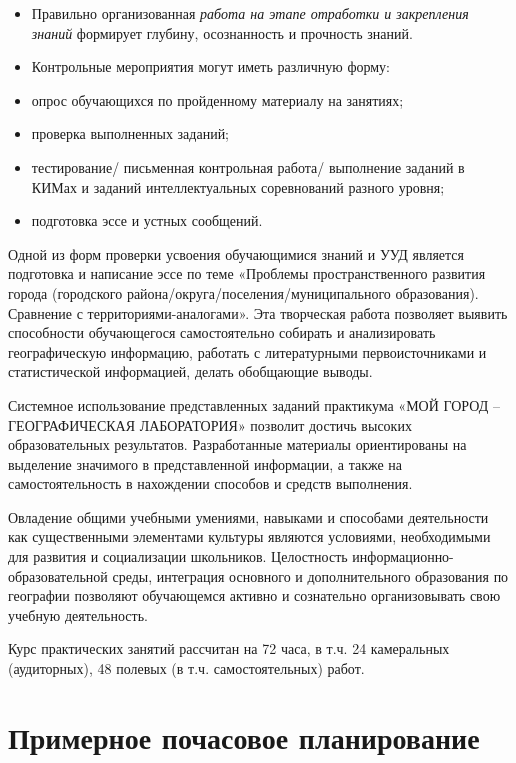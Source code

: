 \documentclass[
  11pt,
  russian,
]{book}
\begin{document}
\begin{itemize}
\item
  Правильно организованная \emph{работа на этапе отработки и закрепления
  знаний} формирует глубину, осознанность и прочность знаний.
\item
  Контрольные мероприятия могут иметь различную форму:
\item
  опрос обучающихся по пройденному материалу на занятиях;
\item
  проверка выполненных заданий;
\item
  тестирование/ письменная контрольная работа/ выполнение заданий в
  КИМах и заданий интеллектуальных соревнований разного уровня;
\item
  подготовка эссе и устных сообщений.
\end{itemize}

Одной из форм проверки усвоения обучающимися знаний и УУД является
подготовка и написание эссе по теме «Проблемы пространственного развития
города (городского района/округа/поселения/муниципального образования).
Сравнение с территориями-аналогами». Эта творческая работа позволяет
выявить способности обучающегося самостоятельно собирать и анализировать
географическую информацию, работать с литературными первоисточниками и
статистической информацией, делать обобщающие выводы.

Системное использование представленных заданий практикума «МОЙ ГОРОД --
ГЕОГРАФИЧЕСКАЯ ЛАБОРАТОРИЯ» позволит достичь высоких образовательных
результатов. Разработанные материалы ориентированы на выделение
значимого в представленной информации, а также на самостоятельность в
нахождении способов и средств выполнения.

Овладение общими учебными умениями, навыками и способами деятельности
как существенными элементами культуры являются условиями, необходимыми
для развития и социализации школьников. Целостность
информационно-образовательной среды, интеграция основного и
дополнительного образования по географии позволяют обучающемся активно и
сознательно организовывать свою учебную деятельность.

Курс практических занятий рассчитан на 72 часа, в т.ч. 24 камеральных
(аудиторных), 48 полевых (в т.ч. самостоятельных) работ.

\hypertarget{ux43fux440ux438ux43cux435ux440ux43dux43eux435-ux43fux43eux447ux430ux441ux43eux432ux43eux435-ux43fux43bux430ux43dux438ux440ux43eux432ux430ux43dux438ux435}{%
\section*{Примерное почасовое
планирование}\label{ux43fux440ux438ux43cux435ux440ux43dux43eux435-ux43fux43eux447ux430ux441ux43eux432ux43eux435-ux43fux43bux430ux43dux438ux440ux43eux432ux430ux43dux438ux435}}
\end{document}
